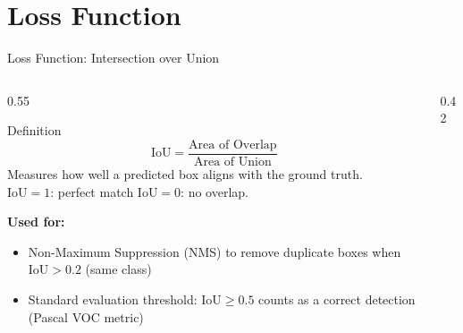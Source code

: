 \documentclass[aspectratio=169, 10pt]{beamer}
\begin{document}
\section{Loss Function}

\begin{frame}{Loss Function: Intersection over Union}
\begin{columns}[T]
\begin{column}{0.55\textwidth}
  \begin{block}{Definition}
    \[
      \text{IoU} = \frac{\text{Area of Overlap}}{\text{Area of Union}}
    \]
    Measures how well a predicted box aligns with the ground truth.\\
    $\text{IoU}=1$: perfect match \quad $\text{IoU}=0$: no overlap.
  \end{block}

  \vspace{0.1cm}
  \textbf{Used for:}
  \begin{itemize}
    \item Non-Maximum Suppression (NMS) to remove duplicate boxes
      when $\text{IoU} > 0.2$ (same class)
    \item Standard evaluation threshold: $\text{IoU} \geq 0.5$ counts
      as a correct detection (Pascal VOC metric)
  \end{itemize}
\end{column}
\begin{column}{0.42\textwidth}
\end{column}
\end{columns}
\end{frame}
\end{document}
